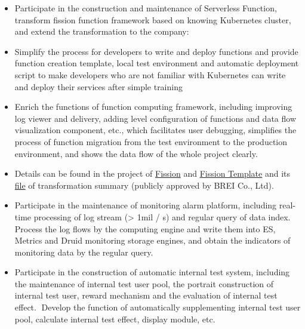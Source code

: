 \documentclass{resume}
\begin{document}
\begin{itemize}[topsep = 0 pt, partopsep = 0pt]
  \item Participate in the construction and maintenance of Serverless Function, transform fission function framework based on knowing Kubernetes cluster, and extend the transformation to the company:
  \item Simplify the process for developers to write and deploy functions and provide function creation template, local test environment and automatic deployment script to make developers who are not familiar with Kubernetes can write and deploy their services after simple training
  \item Enrich the functions of function computing framework, including improving log viewer and delivery, adding level configuration of functions and data flow visualization component, etc., which facilitates user debugging, simplifies the process of function migration from the test environment to the production environment, and shows the data flow of the whole project clearly.
  \item Details can be found in the project of \href{https://github.com/jingtaozhang18/fission}{Fission} and \href{https://github.com/jingtaozhang18/fission-template}{Fission Template} and its \href{https://jingtao.fun/%E6%BA%90%E7%A0%81-Fission%E5%8A%9F%E8%83%BD%E6%8B%93%E5%B1%95/}{file} of transformation summary (publicly approved by BREI Co., Ltd).
\end{itemize}

\begin{itemize}[topsep = 0 pt, partopsep = 0pt]
  \item Participate in the maintenance of monitoring alarm platform, including real-time processing of log stream (> 1mil / s) and regular query of data index. Process the log flows by the computing engine and write them into ES, Metrics and Druid monitoring storage engines, and obtain the indicators of monitoring data by the regular query.
  \item Participate in the construction of automatic internal test system, including the maintenance of internal test user pool, the portrait construction of internal test user, reward mechanism and the evaluation of internal test effect. Develop the function of automatically supplementing internal test user pool, calculate internal test effect, display module, etc.
\end{itemize}
\end{document}
